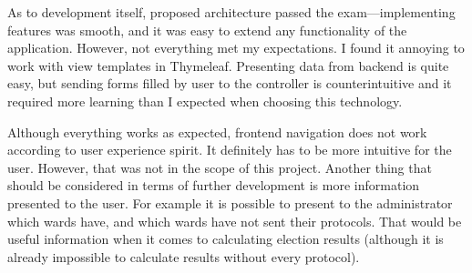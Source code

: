 \documentclass[a4paper,twoside,12pt]{book}
\newcounter{PagesWithoutNumbers}
\begin{document}
  As to development itself, proposed architecture passed the exam---implementing features was smooth, and it was easy to extend any functionality of the application.
  However, not everything met my expectations. I found it annoying to work with view templates in Thymeleaf. 
  Presenting data from backend is quite easy, but sending forms filled by user to the controller is counterintuitive and it required more learning than I expected when choosing this technology.

  Although everything works as expected, frontend navigation does not work according to user experience spirit.
  It definitely has to be more intuitive for the user. However, that was not in the scope of this project.
  Another thing that should be considered in terms of further development is more information presented to the user.
  For example it is possible to present to the administrator which wards have, and which wards have not sent their protocols.
  That would be useful information when it comes to calculating election results (although it is already impossible to calculate results without every protocol).  

\backmatter
{}
\setcounter{page}{\value{PagesWithoutNumbers}}

\pagestyle{onlyPageNumbers}




\end{document}
